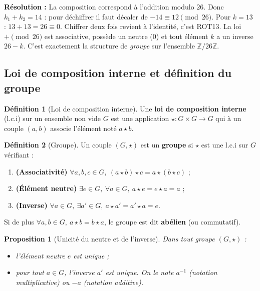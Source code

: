 \documentclass[12pt,a4paper]{report}
\newtheorem{proposition}[theoreme]{Proposition}
\theoremstyle{definition}
\newtheorem{definition}{Définition}[section]
\theoremstyle{remark}
\begin{document}
\textbf{Résolution :}
La composition correspond à l'addition modulo $26$. Donc $k_1 + k_2 = 14$ : pour déchiffrer il faut décaler de $-14 \equiv 12 \pmod{26}$.
Pour $k = 13$ : $13 + 13 = 26 \equiv 0$. Chiffrer deux fois revient à l'identité, c'est ROT13.
La loi $+ \pmod{26}$ est associative, possède un neutre ($0$) et tout élément $k$ a un inverse $26 - k$. C'est exactement la structure de \emph{groupe} sur l'ensemble $\mathbb{Z}/26\mathbb{Z}$.

\subsection{Loi de composition interne et définition du groupe}

\begin{definition}[Loi de composition interne]
Une \textbf{loi de composition interne} (l.c.i) sur un ensemble non vide $G$ est une application $\star : G \times G \to G$ qui à un couple $(a, b)$ associe l'élément noté $a \star b$.
\end{definition}

\begin{definition}[Groupe]
Un couple $(G, \star)$ est un \textbf{groupe} si $\star$ est une l.c.i sur $G$ vérifiant :
\begin{enumerate}
    \item \textbf{(Associativité)} $\forall a, b, c \in G,\ (a \star b) \star c = a \star (b \star c)$ ;
    \item \textbf{(Élément neutre)} $\exists e \in G,\ \forall a \in G,\ a \star e = e \star a = a$ ;
    \item \textbf{(Inverse)} $\forall a \in G,\ \exists a' \in G,\ a \star a' = a' \star a = e$.
\end{enumerate}
Si de plus $\forall a, b \in G,\ a \star b = b \star a$, le groupe est dit \textbf{abélien} (ou commutatif).
\end{definition}

\begin{proposition}[Unicité du neutre et de l'inverse]
Dans tout groupe $(G, \star)$ :
\begin{itemize}
    \item l'élément neutre $e$ est unique ;
    \item pour tout $a \in G$, l'inverse $a'$ est unique. On le note $a^{-1}$ (notation multiplicative) ou $-a$ (notation additive).
\end{itemize}
\end{proposition}
\end{document}

